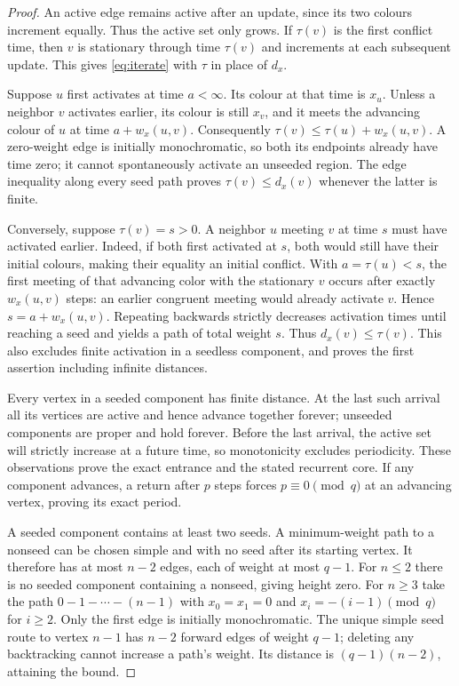 \begin{proof}
An active edge remains active after an update, since its two colours
increment equally. Thus the active set only grows. If $\tau(v)$ is the
first conflict time, then $v$ is stationary through time $\tau(v)$ and
increments at each subsequent update. This gives \eqref{eq:iterate} with
$\tau$ in place of $d_x$.

Suppose $u$ first activates at time $a<\infty$. Its colour at that time
is $x_u$. Unless a neighbor $v$ activates earlier, its colour is still
$x_v$, and it meets the advancing colour of $u$ at time $a+w_x(u,v)$.
Consequently $\tau(v)\le\tau(u)+w_x(u,v)$. A zero-weight edge is initially
monochromatic, so both its endpoints already have time zero; it cannot
spontaneously activate an unseeded region. The edge inequality along every
seed path proves $\tau(v)\le d_x(v)$ whenever the latter is finite.

Conversely, suppose $\tau(v)=s>0$. A neighbor $u$ meeting $v$ at time $s$
must have activated earlier. Indeed, if both first activated at $s$, both
would still have their initial colours, making their equality an initial
conflict. With $a=\tau(u)<s$, the first meeting of that advancing color with
the stationary $v$ occurs after exactly $w_x(u,v)$ steps: an earlier
congruent meeting would already activate $v$. Hence
$s=a+w_x(u,v)$. Repeating backwards strictly decreases activation times
until reaching a seed and yields a path of total weight $s$. Thus
$d_x(v)\le\tau(v)$. This also excludes finite activation in a seedless
component, and proves the first assertion including infinite distances.

Every vertex in a seeded component has finite distance. At the last such
arrival all its vertices are active and hence advance together forever;
unseeded components are proper and hold forever. Before the last arrival,
the active set will strictly increase at a future time, so monotonicity
excludes periodicity. These observations prove the exact entrance and the
stated recurrent core. If any component advances, a return after $p$ steps
forces $p\equiv0\pmod q$ at an advancing vertex, proving its exact period.

A seeded component contains at least two seeds. A minimum-weight path to
a nonseed can be chosen simple and with no seed after its starting vertex.
It therefore has at most $n-2$ edges, each of weight at most $q-1$.
For $n\le2$ there is no seeded component containing a nonseed, giving
height zero. For $n\ge3$ take the path $0-1-\cdots-(n-1)$ with
$x_0=x_1=0$ and $x_i=-(i-1)\pmod q$ for $i\ge2$. Only the first edge is
initially monochromatic. The unique simple seed route to vertex $n-1$
has $n-2$ forward edges of weight $q-1$; deleting any backtracking cannot
increase a path's weight. Its distance is $(q-1)(n-2)$, attaining the bound.
\end{proof}
